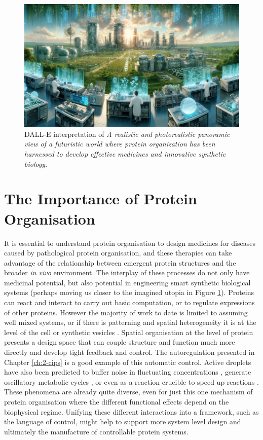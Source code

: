 \begin{figure}
    \centering
    \includegraphics[width=1\textwidth]{figures/5-conc-figs/DALLEharness.png}
    \caption{DALL-E interpretation of \textit{A realistic and photorealistic panoramic view of a futuristic world where protein organization has been harnessed to develop effective medicines and innovative synthetic biology}.}
    \label{fig:5-harness}
\end{figure}

\section{The Importance of Protein Organisation}

It is essential to understand protein organisation to design medicines for diseases caused by pathological protein organisation, and these therapies can take advantage of the relationship between emergent protein structures and the broader \textit{in vivo} environment. The interplay of these processes do not only have medicinal potential, but also potential in engineering smart synthetic biological systems (perhaps moving us closer to the imagined utopia in Figure \ref{fig:5-harness}). Proteins can react and interact to carry out basic computation, or to regulate expressions of other proteins. However the majority of work to date is limited to assuming well mixed systems, or if there is patterning and spatial heterogeneity it is at the level of the cell or synthetic vesicles \cite{JORIN}. Spatial organisation at the level of protein presents a design space that can couple structure and function much more directly and develop tight feedback and control. The autoregulation presented in Chapter \ref{ch:2-cips} is a good example of this automatic control. Active droplets have also been predicted to buffer noise in fluctuating concentrations \cite{kirschbaum_controlling_2021}, generate oscillatory metabolic cycles \cite{ouazan-reboul_self-organization_2023}, or even as a reaction crucible to speed up reactions \cite{wang_liquidliquid_2021}. These phenomena are already quite diverse, even for just this one mechanism of protein organisation where the different functional effects depend on the biophysical regime. Unifying these different interactions into a framework, such as the language of control, might help to support more system level design and ultimately the manufacture of controllable protein systems.

